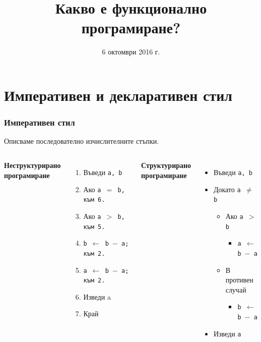\documentclass{beamer}
\title{Какво е функционално програмиране?}
\date{6 октомври 2016 г.}
\begin{document}
\begin{frame}
  \titlepage
\end{frame}

\section*{Императивен и декларативен стил}

\begin{frame}
  \frametitle{Императивен стил}

  Описваме последователно изчислителните стъпки.\\[1em]
  \begin{columns}[t,onlytextwidth]

    \textbf{Неструктурирано\\програмиране}\\[1em]
    \begin{enumerate}
    \item Въведи \tt a, \tt b
    \item Ако \tt{a $=$ b}, към 6.
    \item Ако \tt{a $>$ b}, към 5.
    \item \tt{b $\leftarrow$ b $-$ a}; към 2.
    \item \tt{a $\leftarrow$ b $-$ a}; към 2.
    \item Изведи a
    \item Край
    \end{enumerate}

    \textbf{Структурирано\\програмиране}\\[1em]
    \begin{itemize}
    \item Въведи \tt a, \tt b
    \item Докато \tt{a $\neq$ b}
      \begin{itemize}
      \item Ако \tt{a $>$ b}
        \begin{itemize}
        \item \tt{a $\leftarrow$ b $-$ a}
        \end{itemize}
      \item В противен случай
        \begin{itemize}
        \item \tt{b $\leftarrow$ b $-$ a}
        \end{itemize}
      \end{itemize}
    \item Изведи \tt a
    \end{itemize}

  \end{columns}
\end{frame}
\end{document}
